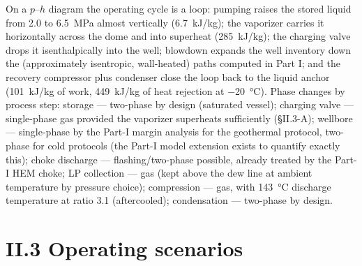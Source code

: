 On a $p$--$h$ diagram the operating cycle is a loop: pumping raises
the stored liquid from \SI{2.0}{} to \SI{6.5}{MPa} almost vertically
(\SI{6.7}{kJ/kg}); the vaporizer carries it horizontally across the
dome and into superheat (\SI{285}{kJ/kg}); the charging valve drops
it isenthalpically into the well; blowdown expands the well inventory
down the (approximately isentropic, wall-heated) paths computed in
Part I; and the recovery compressor plus condenser close the loop
back to the liquid anchor (\SI{101}{kJ/kg} of work, \SI{449}{kJ/kg}
of heat rejection at \SI{-20}{\celsius}). Phase changes by process
step: storage --- two-phase by design (saturated vessel); charging
valve --- single-phase gas provided the vaporizer superheats
sufficiently (\S II.3-A); wellbore --- single-phase by the Part-I
margin analysis for the geothermal protocol, two-phase for cold
protocols (the Part-I model extension exists to quantify exactly
this); choke discharge --- flashing/two-phase possible, already
treated by the Part-I HEM choke; LP collection --- gas (kept above
the dew line at ambient temperature by pressure choice); compression
--- gas, with \SI{143}{\celsius} discharge temperature at ratio 3.1
(aftercooled); condensation --- two-phase by design.

\section{II.3 Operating scenarios}

